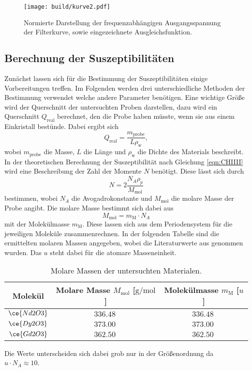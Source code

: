 \begin{figure}
    \centering
    \texttt{[image: build/kurve2.pdf]}
    \caption{Normierte Darstellung der frequenzabhängigen Ausgangsspannung der Filterkurve, sowie eingezeichnete Ausgleichsfunktion.} 
    \label{fig:kurve2}
\end{figure}

\newpage
\subsection{Berechnung der Suszeptibilitäten}
 
Zunächst lassen sich für die Bestimmung der Suszeptibilitäten einige Vorbereitungen treffen. Im Folgenden werden drei unterschiedliche Methoden der Bestimmung verwendet welche andere Parameter benötigen.
Eine wichtige Größe wird der Querschnitt der untersuchten Proben darstellen, dazu wird ein Querschnitt $Q_{\text{real}}$ berechnet, den die Probe haben müsste, wenn sie aus einem Einkristall bestünde. Dabei ergibt
sich \cite{skript}
\begin{equation}
    \label{eqn:qreal}
Q_{\text{real}} = \frac{m_{\text{probe}}}{L \rho_{\text{w}}},
\end{equation}
wobei $m_{\text{probe}}$ die Masse, $L$ die Länge und $\rho_{\text{w}}$ die Dichte des Materials beschreibt.
\\
In der theoretischen Berechnung der Suszeptibilität nach Gleichung \eqref{eqn:CHIIII} wird eine Beschreibung der Zahl der Momente $N$ benötigt.
Diese lässt sich durch 
\begin{equation*}
N = 2\frac{N_{A} \rho_{p}}{M_{\text{mol}}}
\end{equation*}
bestimmen, wobei $N_{A}$ die Avogadrokonstante \cite{lit2} und $M_{\text{mol}}$ die molare Masse der Probe angibt. Die molare Masse bestimmt sich dabei aus \cite{molar}
\begin{equation*}
    M_{\text{mol}} = m_{\text{M}} \cdot N_{A}
\end{equation*}
mit der Molekülmasse $m_{\text{M}}$. Diese lassen sich aus dem Periodensystem für die jeweiligen Moleküle zusammenrechnen. 
In der folgenden Tabelle sind die ermittelten molaren Massen angegeben, wobei die Literaturwerte aus \cite{lit2} genommen wurden. Das $u$ steht dabei für die atomare Masseneinheit.
\begin{table}
    \caption{Molare Massen der untersuchten Materialen.}
    \centering
    \label{tab:molmass}
    \begin{tabular}{c | c c}
        \toprule
        Molekül & Molare Masse $M_{\text{mol}}$ [$\si{\g\per\mol}$] & Molekülmasse $m_{\text{M}}$ [$u$] \\
        \midrule
        $\ce{Nd2O3}$ & $\SI{336.48}{}$      & $\SI{336.48}{}$\\
        $\ce{Dy2O3}$ & $\SI{373.00}{}$    & $\SI{373.00}{}$\\
        $\ce{Gd2O3}$ & $\SI{362.50}{}$    & $\SI{362.50}{}$\\
        \bottomrule    
    \end{tabular}
\end{table}
Die Werte unterscheiden sich dabei grob nur in der Größenordnung da $u \cdot N_{A} \approx 10$.

